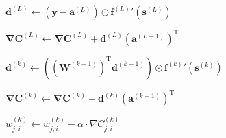 \documentclass[titlepage]{article}
\begin{document}
      \begin{algorithm}
        \caption{%
          Algorithm \ref{algadjustgradient} with matrix-vector notation.
        }
        \begin{algorithmic}
            \State $
              \mathbf{d}^{(L)} \gets
                \left( \mathbf{y} - \mathbf{a}^{(L)} \right)
                \odot
                {\mathbf{f}^{(L)}}' \left( \mathbf{s}^{(L)} \right)
            $

            \State $
              \mathbf{\nabla C}^{(L)} \gets
                \mathbf{\nabla C}^{(L)}
                +
                \mathbf{d}^{(L)} \left( \mathbf{a}^{(L-1)} \right)^\mathrm{T}
            $ 

              \State $
                \mathbf{d}^{(k)} \gets
                  \left(
                    \left( \mathbf{W}^{(k+1)} \right)^\mathrm{T}
                    \mathbf{d}^{(k+1)}
                  \right)
                  \odot
                  {\mathbf{f}^{(k)}}' \left( \mathbf{s}^{(k)} \right)
              $

              \State $
                \mathbf{\nabla C}^{(k)} \gets
                  \mathbf{\nabla C}^{(k)}
                  +
                  \mathbf{d}^{(k)} \left( \mathbf{a}^{(k-1)} \right)^\mathrm{T}
              $ 
            \EndFor
          \EndProcedure
        \end{algorithmic}
      \end{algorithm}

      \begin{algorithm}
        \caption{%
          Adjust the weights and biases of the network with the gradient of the
          current batch and the given learning rate.
        } \label{algadjustweights}
        \begin{algorithmic}
                  \State $
                    w_{j,i}^{(k)} \gets
                      w_{j,i}^{(k)} - \alpha \cdot \nabla C_{j,i}^{(k)}
                  $
                \EndFor
              \EndFor
            \EndFor
          \EndProcedure
        \end{algorithmic}
      \end{algorithm}
\end{document}
